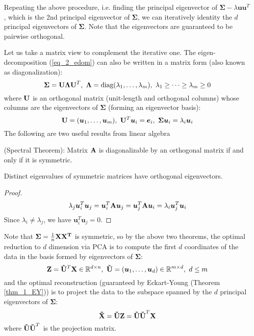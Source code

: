 \documentclass[../main.tex]{subfiles}
\begin{document}
\par Repeating the above procedure, i.e. finding the principal eigenvector of $\bm{\Sigma}-\lambda \bm{uu}^T$, which is the 2nd principal eigenvector of $\bm{\Sigma}$, we can iteratively identity the $d$ principal eigenvectors of $\bm{\Sigma}$. Note that the eigenvectors are guaranteed to be pairwise orthogonal.
\par Let us take a matrix view to complement the iterative one. The eigen-decomposition (\ref{eq_2_edom}) can also be written in a matrix form (also known as diagonalization):
\begin{equation*}
{\bf \Sigma = U\Lambda U}^T,\ {\bf \Lambda} =\text{diag}(\lambda_1,\dots, \lambda_m),\ \lambda_1\geq\dots\geq\lambda_m\geq 0
\end{equation*}
where ${\bf U}$ is an orthogonal matrix (unit-length and orthogonal columns) whose columns are the eigenvectors of $\bm{\Sigma}$ (forming an eigenvector basis):
\begin{equation*}
{\bf U}=(\bm{u}_1,\dots,\bm{u}_m),\ {\bf U}^T\bm{u}_i=\bm{e}_i,\ \bm{\Sigma u}_i = \lambda_i\bm{u}_i
\end{equation*}
The following are two useful results from linear algebra
\begin{theorem}\label{thm_2_spectral}
	(Spectral Theorem): Matrix ${\bf A}$ is diagonalizable by an orthogonal matrix if and only if it is symmetric.
\end{theorem}
\begin{theorem}
	Distinct eigenvalues of symmetric matrices have orthogonal eigenvectors.
\end{theorem}
\begin{proof}
	\begin{equation*}
	\lambda_j \bm{u}_i^T\bm{u}_j = \bm{u}_i^T{\bf A}\bm{u}_j = \bm{u}_j^T{\bf A}\bm{u}_i = \lambda_i \bm{u}_j^T\bm{u}_i
	\end{equation*}
	Since $\lambda_i\neq \lambda_j$, we have $\bm{u}_i^T\bm{u}_j=0$.
\end{proof}
\vbox{}
\par Note that $\bm{\Sigma}=\frac{1}{n}{\bf XX^T}$ is symmetric, so by the above two theorems, the optimal reduction to $d$ dimension via PCA is to compute the first $d$ coordinates of the data in the basis formed by eigenvectors of $\bm{\Sigma}$:
\begin{equation*}
{\bf Z}={\bf \tilde{U}}^T{\bf X}\in \mathbb{R}^{d\times n},\ {\bf \tilde{U}} = (\bm{u}_1,\dots,\bm{u}_d)\in\mathbb{R}^{m\times d},\ d\leq m
\end{equation*}
and the optimal reconstruction (guaranteed by Eckart-Young (Theorem \ref{thm_1_EY})) is to project the data to the subspace spanned by the $d$ principal eigenvectors of $\bm{\Sigma}$:
\begin{equation*}
{\bf \tilde{X}}={\bf \tilde{U}Z} = {\bf \tilde{U}\tilde{U}}^T{\bf X}
\end{equation*}
where ${\bf \tilde{U}\tilde{U}}^T$ is the projection matrix.
\end{document}
